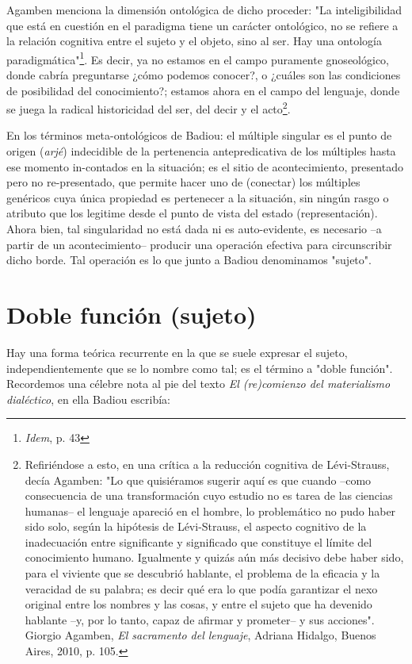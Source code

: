 Agamben menciona la dimensión ontológica de dicho proceder: "La
inteligibilidad que está en cuestión en el paradigma tiene un carácter
ontológico, no se refiere a la relación cognitiva entre el sujeto y el
objeto, sino al ser. Hay una ontología paradigmática"\footnote{\emph{Idem},
  p. 43}. Es decir, ya no estamos en el campo puramente gnoseológico,
donde cabría preguntarse ¿cómo podemos conocer?, o ¿cuáles son las
condiciones de posibilidad del conocimiento?; estamos ahora en el campo
del lenguaje, donde se juega la radical historicidad del ser, del decir
y el acto\footnote{Refiriéndose a esto, en una crítica a la reducción
  cognitiva de Lévi-Strauss, decía Agamben: "Lo que quisiéramos sugerir
  aquí es que cuando --como consecuencia de una transformación cuyo
  estudio no es tarea de las ciencias humanas-- el lenguaje apareció en
  el hombre, lo problemático no pudo haber sido solo, según la hipótesis
  de Lévi-Strauss, el aspecto cognitivo de la inadecuación entre
  significante y significado que constituye el límite del conocimiento
  humano. Igualmente y quizás aún más decisivo debe haber sido, para el
  viviente que se descubrió hablante, el problema de la eficacia y la
  veracidad de su palabra; es decir qué era lo que podía garantizar el
  nexo original entre los nombres y las cosas, y entre el sujeto que ha
  devenido hablante --y, por lo tanto, capaz de afirmar y prometer-- y
  sus acciones". Giorgio Agamben, \emph{El sacramento del lenguaje},
  Adriana Hidalgo, Buenos Aires, 2010, p. 105.}.

En los términos meta-ontológicos de Badiou: el múltiple singular es el
punto de origen (\emph{arjé}) indecidible de la pertenencia
antepredicativa de los múltiples hasta ese momento in-contados en la
situación; es el sitio de acontecimiento, presentado pero no
re-presentado, que permite hacer uno de (conectar) los múltiples
genéricos cuya única propiedad es pertenecer a la situación, sin ningún
rasgo o atributo que los legitime desde el punto de vista del estado
(representación). Ahora bien, tal singularidad no está dada ni es
auto-evidente, es necesario --a partir de un acontecimiento-- producir
una operación efectiva para circunscribir dicho borde. Tal operación es
lo que junto a Badiou denominamos "sujeto".

\section{Doble función (sujeto)}

Hay una forma teórica recurrente en la que se suele expresar el sujeto,
independientemente que se lo nombre como tal; es el término a "doble
función". Recordemos una célebre nota al pie del texto \emph{El
(re)comienzo del materialismo dialéctico}, en ella Badiou escribía:

